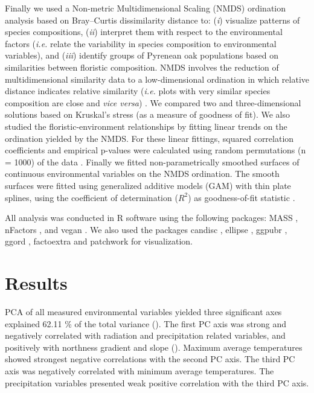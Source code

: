 Finally we used a Non-metric Multidimensional Scaling (NMDS) ordination analysis based on Bray--Curtis dissimilarity distance \autocite{Kruskal1964NonmetricMultidimensional} to: (\emph{i}) visualize patterns of species compositions, (\emph{ii}) interpret them with respect to the environmental factors (\emph{i.e.} relate the variability in species composition to environmental variables), and (\emph{iii}) identify groups of Pyrenean oak populations based on similarities between floristic composition. NMDS involves the reduction of multidimensional similarity data to a low-dimensional ordination in which relative distance indicates relative similarity (\emph{i.e.} plots with very similar species composition are close and \emph{vice versa}) \autocite{Minchin1987SimulationMultidimensional}. We compared two and three-dimensional solutions based on Kruskal's stress (as a measure of goodness of fit). We also studied the floristic-environment relationships by fitting linear trends on the ordination yielded by the NMDS. For these linear fittings, squared correlation coefficients and empirical p-values were calculated using random permutations (n = 1000) of the data \autocite{Oksanen2013MultivariateAnalysis}. Finally we fitted non-parametrically smoothed surfaces of continuous environmental variables on the NMDS ordination. The smooth surfaces were fitted using generalized additive models (GAM) with thin plate splines, using the coefficient of determination (\(R^2\)) as goodness-of-fit statistic \autocites[\emph{e.g.}][]{Oksanen2013MultivariateAnalysis,Virtanenetal2006BroadScale}.

All analysis was conducted in R software \autocite{RCoreTeam2019LanguageEnvironment} using the following packages: MASS \autocite{MASS}, nFactors \autocite{nFactors}, and vegan \autocite{vegan}. We also used the packages candisc \autocite{candisc}, ellipse \autocite{ellipse}, ggpubr \autocite{ggpubr}, ggord \autocite{ggord}, factoextra \autocite{factoextra} and patchwork \autocite{patchwork} for visualization.

\section{Results}\label{sec:multivar:Results}
PCA of all measured environmental variables yielded three significant axes explained 62.11 \% of the total variance (). The first PC axis was strong and negatively correlated with radiation and precipitation related variables, and positively with northness gradient and slope (). Maximum average temperatures showed strongest negative correlations with the second PC axis. The third PC axis was negatively correlated with minimum average temperatures. The precipitation variables presented weak positive correlation with the third PC axis.

